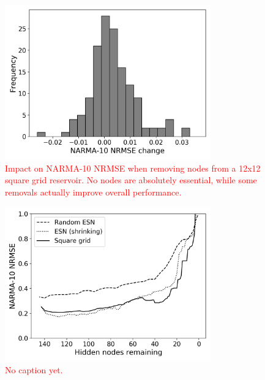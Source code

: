 \begin{figure}
  \centering
  \includegraphics[width=3.5in]{figures/removal-hist.png}
  \caption{
    \textcolor{red}{
      Impact on NARMA-10 NRMSE when removing nodes from a 12x12 square grid
reservoir. No nodes are absolutely essential, while some removals actually
improve overall performance.
    }
  }
  \label{fig:rt-removal-hist}
\end{figure}

\begin{figure}
  \centering
  \includegraphics[width=3.5in]{figures/shrink-performance.png}
  \caption{
    \textcolor{red}{
      No caption yet.
    }
  }
  \label{fig:sq-shrink-performance}
\end{figure}

